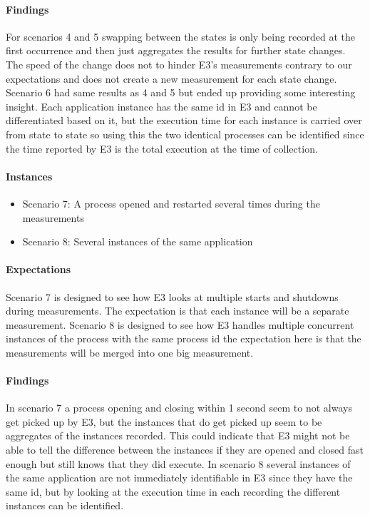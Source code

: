 \paragraph{Findings}
For scenarios 4 and 5 swapping between the states is only being recorded at the first occurrence and then just aggregates the results for further state changes. The speed of the change does not to hinder E3's measurements contrary to our expectations and does not create a new measurement for each state change. Scenario 6 had same results as 4 and 5 but ended up providing some interesting insight. Each application instance has the same id in E3 and cannot be differentiated based on it, but the execution time for each instance is carried over from state to state so using this the two identical processes can be identified since the time reported by E3 is the total execution at the time of collection.

\paragraph{Instances}

\begin{itemize}
    \item Scenario 7: A process opened and restarted several times during the measurements
    \item Scenario 8: Several instances of the same application
\end{itemize}

\paragraph{Expectations}
Scenario 7 is designed to see how E3 looks at multiple starts and shutdowns during measurements. The expectation is that each instance will be a separate measurement. Scenario 8 is designed to see how E3 handles multiple concurrent instances of the process with the same process id the expectation here is that the measurements will be merged into one big measurement. 
\paragraph{Findings}
In scenario 7 a process opening and closing within 1 second seem to not always get picked up by E3, but the instances that do get picked up seem to be aggregates of the instances recorded. This could indicate that E3 might not be able to tell the difference between the instances if they are opened and closed fast enough but still knows that they did execute. In scenario 8 several instances of the same application are not immediately identifiable in E3 since they have the same id, but by looking at the execution time in each recording the different instances can be identified.

